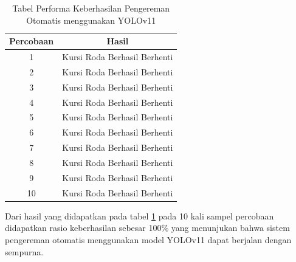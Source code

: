 \begin{table}[H]
  \centering
  \caption{Tabel Performa Keberhasilan Pengereman Otomatis menggunakan YOLOv11}
  \label{tb:tabelyolov11performa}
  \begin{tabular}{|c|c|}
  \hline
  Percobaan & Hasil                                                \\ \hline
  1         & \cellcolor[HTML]{34FF34}Kursi Roda Berhasil Berhenti \\ \hline
  2         & \cellcolor[HTML]{34FF34}Kursi Roda Berhasil Berhenti \\ \hline
  3         & \cellcolor[HTML]{34FF34}Kursi Roda Berhasil Berhenti \\ \hline
  4         & \cellcolor[HTML]{34FF34}Kursi Roda Berhasil Berhenti \\ \hline
  5         & \cellcolor[HTML]{34FF34}Kursi Roda Berhasil Berhenti \\ \hline
  6         & \cellcolor[HTML]{34FF34}Kursi Roda Berhasil Berhenti \\ \hline
  7         & \cellcolor[HTML]{34FF34}Kursi Roda Berhasil Berhenti \\ \hline
  8         & \cellcolor[HTML]{34FF34}Kursi Roda Berhasil Berhenti \\ \hline
  9         & \cellcolor[HTML]{34FF34}Kursi Roda Berhasil Berhenti \\ \hline
  10        & \cellcolor[HTML]{34FF34}Kursi Roda Berhasil Berhenti \\ \hline
  \end{tabular}
  \end{table}

Dari hasil yang didapatkan pada tabel \ref{tb:tabelyolov11performa} pada 10 kali sampel percobaan didapatkan rasio keberhasilan sebesar 100\% yang menunjukan bahwa sistem pengereman otomatis menggunakan model YOLOv11 dapat berjalan dengan sempurna.

